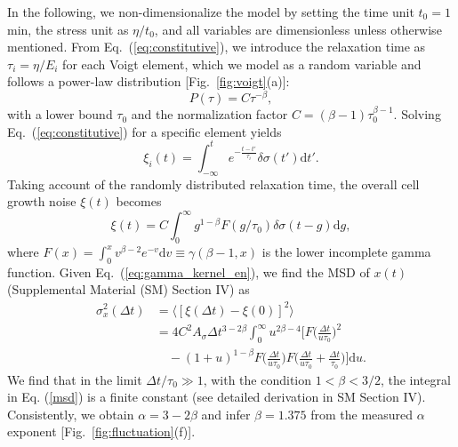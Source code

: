 \documentclass[aps, prl, twocolumn, longbibliography, linenumbers, superscriptaddress]{revtex4-2}
\newcommand{\blue}{\color{blue}}
\begin{document}
In the following, we non-dimensionalize the model by setting the time unit $t_0=1$ min, the stress unit as $\eta/t_0$, and all variables are dimensionless unless otherwise mentioned. From Eq.~(\ref{eq:constitutive}), we introduce the relaxation time as $\tau_i = \eta/E_i$ for each Voigt element, which we model as a random variable and follows a power-law distribution [Fig.~\ref{fig:voigt}(a)]:
\begin{equation}
	P(\tau)=C\tau^{-\beta},
	\label{eq:power-law-P-tau}
\end{equation}
with a lower bound $\tau_0$ and the normalization factor $C=(\beta-1)\tau_0^{\beta-1}$. Solving Eq.~(\ref{eq:constitutive}) for a specific element yields
\begin{equation}
	 \xi_i(t) = \int_{-\infty}^{t} e^{-\frac{t-t'}{\tau_i}} \delta \sigma(t') \mathrm{d}t'.
	\label{eq:gamma_tau_integral_en}
\end{equation}
Taking account of the randomly distributed relaxation time, the overall cell growth noise $\xi(t)$ becomes
\begin{equation}
	\xi(t)  = C \int_{0}^{\infty} g^{1-\beta} F(g/\tau_0) \delta \sigma(t-g) \mathrm{d}g,
	\label{eq:gamma_kernel_en}
\end{equation}
where $F(x)=\int_0^{x} v^{\beta-2} e^{-v}\mathrm{d}v \equiv \gamma(\beta-1, x)$ is the lower incomplete gamma function. Given Eq.~(\ref{eq:gamma_kernel_en}), we find the MSD of $x(t)$ (Supplemental Material (SM) Section IV) as
\begin{equation}
	\begin{aligned} 
		 \sigma_x^2(\Delta t) &= \langle [\xi(\Delta t)-\xi(0)]^2\rangle \\
		&= 4C^2 A_{\sigma} \Delta t^{3-2\beta} \int_{0}^{\infty} u^{2\beta -4}\Big[F\Big(\frac{\Delta t}{u\tau_0}\Big)^2\\
		&\quad - (1+u)^{1-\beta} F\Big(\frac{\Delta t}{u\tau_0}\Big) F\Big(\frac{\Delta t}{u\tau_0}+\frac{\Delta t}{\tau_0}\Big) \Big] \mathrm{d}u.
	\end{aligned}\label{msd}
\end{equation}
{\blue We find that in the limit $\Delta t/\tau_0 \gg 1$, with the condition $1<\beta <3/2$, the integral in Eq. (\ref{msd}) is a finite constant ({\blue see detailed derivation in SM Section IV)}. Consistently, we obtain $\alpha = 3 - 2\beta$ and infer $\beta= 1.375$ from the measured $\alpha$ exponent [Fig.~\ref{fig:fluctuation}(f)].}
\end{document}
